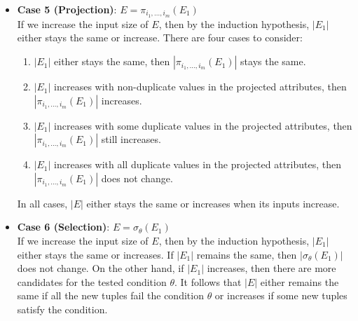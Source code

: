 \begin{enumerate}
\begin{itemize}
    \item \textbf{Case 5 (Projection)}: $E = \pi_{i_1,...,i_m}(E_1)$ \\
    If we increase the input size of $E$, then by the induction hypothesis, $|E_1|$ either stays the same or increase. There are four 
    cases to consider:
    \begin{enumerate}
      \item $|E_1|$ either stays the same, then $|\pi_{i_1,...,i_m}(E_1)|$ stays the same.  
      \item $|E_1|$ increases with non-duplicate values in the projected attributes, then \\ $|\pi_{i_1,...,i_m}(E_1)|$ increases.
      \item $|E_1|$ increases with some duplicate values in the projected attributes, then \\ $|\pi_{i_1,...,i_m}(E_1)|$ still increases.
      \item $|E_1|$ increases with all duplicate values in the projected attributes, then \\ $|\pi_{i_1,...,i_m}(E_1)|$ does not change.
    \end{enumerate} 
    In all cases, $|E|$ either stays the same or increases when its inputs increase. 

    \item \textbf{Case 6 (Selection)}: $E = \sigma_{\theta}(E_1)$ \\
    If we increase the input size of $E$, then by the induction hypothesis, $|E_1|$ either stays the same or increases. If $|E_1|$ remains 
    the same, then $|\sigma_{\theta}(E_1)|$ does not change. On the other hand, if $|E_1|$ increases, then there are more candidates for 
    the tested condition $\theta$. It follows that $|E|$ either remains the same if all the new tuples fail the 
    condition $\theta$ or increases if some new tuples satisfy the condition. 
  \end{itemize}  


\end{enumerate}

